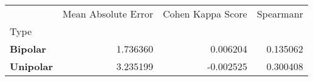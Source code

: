 \begin{table}[H]
\begin{tabular}{lrrr}
\toprule
 & Mean Absolute Error & Cohen Kappa Score & Spearmanr \\
Type &  &  &  \\
\midrule
\textbf{Bipolar} & 1.736360 & 0.006204 & 0.135062 \\
\textbf{Unipolar} & 3.235199 & -0.002525 & 0.300408 \\
\bottomrule
\end{tabular}
\end{table}
